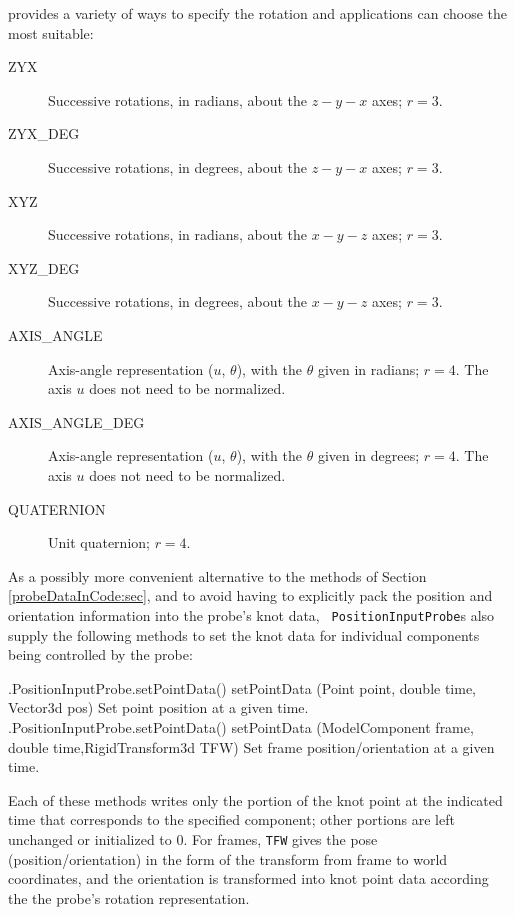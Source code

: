  provides a variety of ways
to specify the rotation and applications can choose the most suitable:

\begin{description}

\item[ZYX]\mbox{}

Successive rotations, in radians, about the $z-y-x$ axes; $r = 3$.

\item[ZYX\_DEG]\mbox{}

Successive rotations, in degrees, about the $z-y-x$ axes; $r = 3$.

\item[XYZ]\mbox{}

Successive rotations, in radians, about the $x-y-z$ axes; $r = 3$.

\item[XYZ\_DEG]\mbox{}

Successive rotations, in degrees, about the $x-y-z$ axes; $r = 3$.

\item[AXIS\_ANGLE]\mbox{}

Axis-angle representation ($u$, $\theta$), with the $\theta$ given in
radians; $r = 4$. The axis $u$ does not need to be normalized.

\item[AXIS\_ANGLE\_DEG]\mbox{}

Axis-angle representation ($u$, $\theta$), with the $\theta$ given in
degrees; $r = 4$. The axis $u$ does not need to be normalized.

\item[QUATERNION]\mbox{}

Unit quaternion; $r = 4$.

\end{description}

As a possibly more convenient alternative to the methods of
Section \ref{probeDataInCode:sec}, and to avoid having to explicitly pack the
position and orientation information into the probe's knot data, {\tt
PositionInputProbe}s also supply the following methods to set the knot data for
individual components being controlled by the probe:

%
\begin{methodtable}{0.7}{0.3}
\midline
%
\methodentry
{\probes.PositionInputProbe.setPointData()}%
{setPointData (Point point, double time, Vector3d pos)}%
{Set point position at a given time.}%
%
\methodentry
{\probes.PositionInputProbe.setPointData()}%
{setPointData (ModelComponent frame, double time,\brh RigidTransform3d TFW)}%
{Set frame position/orientation at a given time.}%
%
\midline
\end{methodtable}
%
Each of these methods writes only the portion of the knot point at the
indicated time that corresponds to the specified component; other portions are
left unchanged or initialized to 0. For frames, {\tt TFW} gives the pose
(position/orientation) in the form of the transform from frame to world
coordinates, and the orientation is transformed into knot point data according
the the probe's rotation representation.

